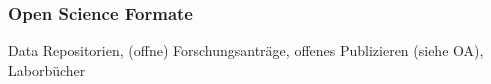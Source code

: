 \subsubsection{Open Science Formate}
Data Repositorien, (offne) Forschungsanträge, offenes Publizieren (siehe OA), Laborbücher
